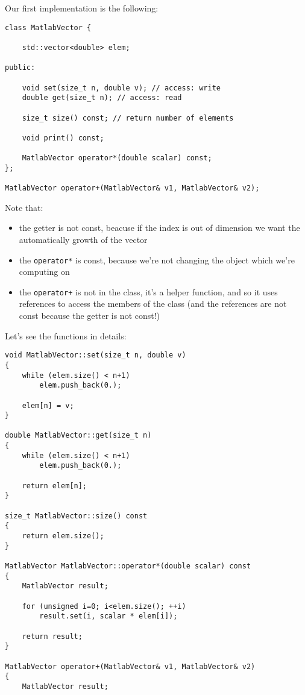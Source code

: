 \begin{enumerate}[$\triangleright$]
Our first implementation is the following:
\begin{lstlisting}
class MatlabVector {

    std::vector<double> elem;

public:

    void set(size_t n, double v); // access: write
    double get(size_t n); // access: read

    size_t size() const; // return number of elements

    void print() const;

    MatlabVector operator*(double scalar) const;
};

MatlabVector operator+(MatlabVector& v1, MatlabVector& v2);   
\end{lstlisting}

Note that:
\begin{itemize}
    \item the getter is not const, beacuse if the index is out of dimension we want the automatically growth of the vector

    \item the \texttt{operator*} is const, because we're not changing the object which we're computing on

    \item the \texttt{operator+} is not in the class, it's a helper function, and so it uses references to access the members of the class (and the references are not const because the getter is not const!)
\end{itemize}

Let's see the functions in details:
\begin{lstlisting}
void MatlabVector::set(size_t n, double v)
{
    while (elem.size() < n+1)
        elem.push_back(0.);
    
    elem[n] = v;
}

double MatlabVector::get(size_t n)
{
    while (elem.size() < n+1)
        elem.push_back(0.);

    return elem[n];
}

size_t MatlabVector::size() const
{
    return elem.size();
}

MatlabVector MatlabVector::operator*(double scalar) const
{
    MatlabVector result;

    for (unsigned i=0; i<elem.size(); ++i)
        result.set(i, scalar * elem[i]);

    return result;
}

MatlabVector operator+(MatlabVector& v1, MatlabVector& v2)
{
    MatlabVector result;


\end{lstlisting}
\end{enumerate}

